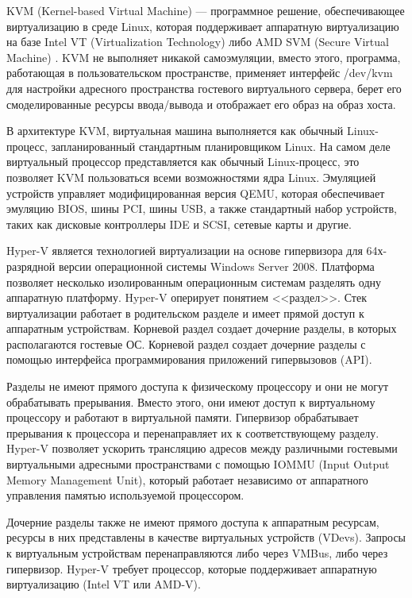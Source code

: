 KVM (Kernel-based Virtual Machine) --- программное решение, обеспечивающее виртуализацию в среде Linux, которая поддерживает аппаратную виртуализацию на базе Intel VT (Virtualization Technology) либо AMD SVM (Secure Virtual Machine) \cite{kvm-ibm}.
KVM не выполняет никакой самоэмуляции, вместо этого, программа, работающая в пользовательском пространстве, применяет интерфейс /dev/kvm для настройки адресного пространства гостевого виртуального сервера, берет его смоделированные ресурсы ввода/вывода и отображает его образ на образ хоста.

В архитектуре KVM, виртуальная машина выполняется как обычный Linux-процесс, запланированный стандартным планировщиком Linux.
На самом деле виртуальный процессор представляется как обычный Linux-процесс, это позволяет KVM пользоваться всеми возможностями ядра Linux.
Эмуляцией устройств управляет модифицированная версия QEMU, которая обеспечивает эмуляцию BIOS, шины PCI, шины USB, а также стандартный набор устройств, таких как дисковые контроллеры IDE и SCSI, сетевые карты и другие.

Hyper-V является технологией виртуализации на основе гипервизора для 64х-разрядной версии операционной системы Windows Server 2008.
Платформа позволяет несколько изолированным операционным системам разделять одну аппаратную платформу.
Hyper-V оперирует понятием <<раздел>>.
Стек виртуализации работает в родительском разделе и имеет прямой доступ к аппаратным устройствам.
Корневой раздел создает дочерние разделы, в которых располагаются гостевые ОС.
Корневой раздел создает дочерние разделы с помощью интерфейса программирования приложений гипервызовов (API).

Разделы не имеют прямого доступа к физическому процессору и они не могут обрабатывать прерывания.
Вместо этого, они имеют доступ к виртуальному процессору и работают в виртуальной памяти.
Гипервизор обрабатывает прерывания к процессора и перенаправляет их к соответствующему разделу.
Hyper-V позволяет ускорить трансляцию адресов между различными гостевыми виртуальными адресными пространствами с помощью IOMMU (Input Output Memory Management Unit), который работает независимо от аппаратного управления памятью используемой процессором.

Дочерние разделы также не имеют прямого доступа к аппаратным ресурсам, ресурсы в них представлены в качестве виртуальных устройств (VDevs).
Запросы к виртуальным устройствам перенаправляются либо через VMBus, либо через гипервизор.
Hyper-V требует процессор, которые поддерживает аппаратную виртуализацию (Intel VT или AMD-V).

